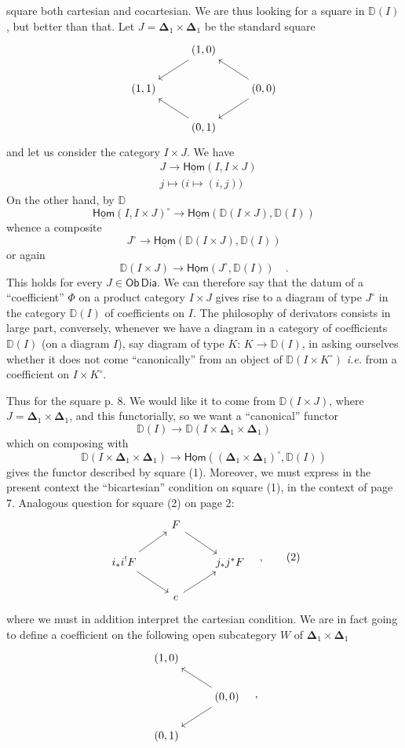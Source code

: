 \documentclass[11pt]{article}
\newcommand{\printedpage}[1]{\marginpar{\footnotesize p.~#1}}
\newcommand{\msp}[1]{\marginpar{\footnotesize [#1]}}
\newcommand{\Dia}{\mathsf{Dia}}
\newcommand{\DD}{\mathbb{D}}
\newcommand{\Hom}{\underline{\mathsf{Hom}}}
\newcommand{\Ob}{\mathsf{Ob}}
\newcommand{\Del}{\boldsymbol{\Delta}}
\begin{document}
square both cartesian and cocartesian. We are thus looking for a square in $\DD(I)$, but better than that. Let $J = \Del_1 \times \Del_1$ be the standard square
\[
\begin{tikzcd}
& (1,0) \arrow[dl] & \\
(1,1) & & (0,0) \arrow[ul] \arrow[dl] \\
& (0,1) \arrow[ul] &
\end{tikzcd}
\]
and let us consider the category $I \times J$. We have
\[
\begin{aligned}
& J \longrightarrow \Hom(I, I \times J) \\
& j \longmapsto \bigl(i \longmapsto (i,j)\bigr)
\end{aligned}
\]
On the other hand, by $\DD$
\[ \Hom(I, I \times J)^{\circ} \longrightarrow \Hom(\DD(I \times J), \DD(I)) \]
whence a composite
\[ J^{\circ} \longrightarrow \Hom(\DD(I \times J), \DD(I)) \]
or again
\[ \DD(I \times J) \longrightarrow \Hom(J^{\circ}, \DD(I)) \quad . \]
This holds for every $J \in \Ob \, \Dia$. We can therefore say that the datum of a ``coefficient'' $\Phi$ on a product category $I \times J$ gives rise to a diagram of type $J^{\circ}$ in the category $\DD(I)$ of coefficients on $I$. The philosophy
\msp{page 9}
of derivators consists in large part, conversely, whenever we have a diagram in a category of coefficients $\DD(I)$ (on a diagram $I$), say diagram of type $K$: $K \to \DD(I)$, in asking ourselves whether it does not come ``canonically'' from an object of $\DD(I \times K^{\circ})$ \textit{i.e.} from a coefficient on $I \times K^{\circ}$.

Thus for the square p. 8. We would like it to come from $\DD(I \times J)$, where $J = \Del_1 \times \Del_1$, and this functorially, so we want a ``canonical'' functor
\[ \DD(I) \longrightarrow \DD(I \times \Del_1 \times \Del_1) \]
which on composing with
\[ \DD(I \times \Del_1 \times \Del_1) \longrightarrow \Hom((\Del_1 \times \Del_1)^{\circ}, \DD(I)) \]
\printedpage{8}
gives the functor described by square (1). Moreover, we must express in the present context the ``bicartesian'' condition on square (1), in the context of page 7. Analogous question for square (2) on page 2:
\[
\begin{tikzcd}
& F \arrow[dr] & \\
i_*i^!F \arrow[ur] \arrow[dr] & & j_*j^*F \\
& e \arrow[ur] &
\end{tikzcd}
\quad ,
\tag*{(2)}
\]
where we must in addition interpret the cartesian condition. We are in fact going to define a coefficient on the following open subcategory $W$ of $\Del_1 \times \Del_1$
\[
\begin{tikzcd}
(1,0) & \\
& (0,0) \arrow[ul] \arrow[dl] \\
(0,1) &
\end{tikzcd}
\quad ,
\]
\end{document}
